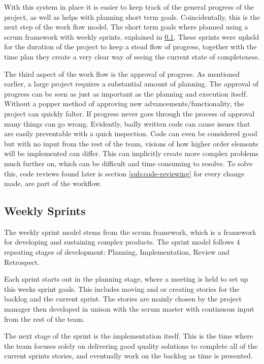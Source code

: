     With this system in place it is easier to keep track of the general progress of the project, as well as helps with planning short term goals. Coincidentally, this is the next step of the work flow model. The short term goals where planned using a scrum framework with weekly sprints, explained in \ref{sub:weekly-sprints}. These sprints were upheld for the duration of the project to keep a stead flow of progress, together with the time plan they create a very clear way of seeing the current state of completeness. 

    The third aspect of the work flow is the approval of progress. As mentioned earlier, a large project requires a substantial amount of planning. The approval of progress can be seen as just as important as the planning and execution itself. Without a popper method of approving new advancements/functionality, the project can quickly falter. If progress never goes through the process of approval many things can go wrong. Evidently, badly written code can cause issues that are easily preventable with a quick inspection. Code can even be considered good but with no input from the rest of the team, visions of how higher order elements will be implemented can differ. This can implicitly create  more complex problems much further on, which can be difficult and time consuming to resolve. To solve this, code reviews found later is section \ref{sub:code-reviewing} for every change made, are part of the workflow.  

    \subsection{Weekly Sprints} \label{sub:weekly-sprints}
        The weekly sprint model stems from the scrum framework, which is a framework for developing and sustaining complex products. The sprint model follows 4 repeating stages of development: Planning, Implementation, Review and Retrospect.
    
        Each sprint starts out in the planning stage, where a meeting is held to set up this weeks sprint goals. This includes moving and or creating stories for the backlog and the current sprint. The stories are mainly chosen by the project manager then developed in unison with the scrum master with continuous input from the rest of the team.
    
        The next stage of the sprint is the implementation itself. This is the time where the team focuses solely on delivering good quality solutions to complete all of the current sprints stories, and eventually work on the backlog as time is presented.
    
